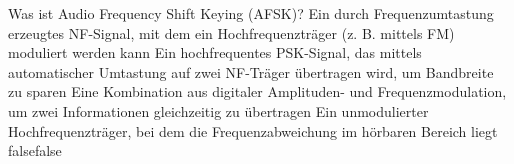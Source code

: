    {Was ist Audio Frequency Shift Keying (AFSK)?}
    {Ein durch Frequenzumtastung erzeugtes NF-Signal, mit dem ein Hochfrequenzträger (z. B. mittels FM) moduliert werden kann}
    {Ein hochfrequentes PSK-Signal, das mittels automatischer Umtastung auf zwei NF-Träger übertragen wird, um Bandbreite zu sparen}
    {Eine Kombination aus digitaler Amplituden- und Frequenzmodulation, um zwei Informationen gleichzeitig zu übertragen}
    {Ein unmodulierter Hochfrequenzträger, bei dem die Frequenzabweichung im hörbaren Bereich liegt
 }
    {false}{false}
